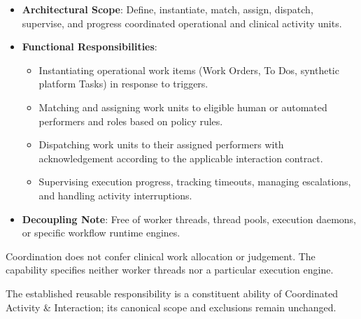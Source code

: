 
\begin{itemize}

\item
\textbf{Architectural Scope}: Define, instantiate, match, assign, dispatch, supervise, and progress coordinated operational and clinical activity units.



\item
\textbf{Functional Responsibilities}:


\begin{itemize}

\item
Instantiating operational work items (Work Orders, To Dos, synthetic platform Tasks) in response to triggers.



\item
Matching and assigning work units to eligible human or automated performers and roles based on policy rules.



\item
Dispatching work units to their assigned performers with acknowledgement according to the applicable interaction contract.



\item
Supervising execution progress, tracking timeouts, managing escalations, and handling activity interruptions.



\end{itemize}


\item
\textbf{Decoupling Note}: Free of worker threads, thread pools, execution daemons, or specific workflow runtime engines.



\end{itemize}


Coordination does not confer clinical work allocation or judgement. The capability specifies neither worker threads nor a particular execution engine.



The established reusable responsibility is a constituent ability of Coordinated Activity \& Interaction; its canonical scope and exclusions remain unchanged.


